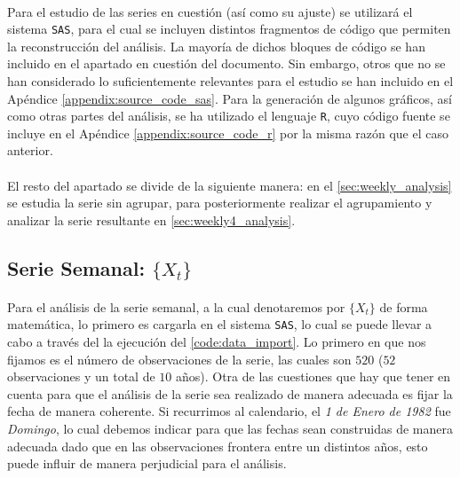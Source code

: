 \documentclass[a4paper, spanish]{article}
\begin{document}
    \paragraph{}
    Para el estudio de las series en cuestión (así como su ajuste) se utilizará el sistema \texttt{SAS}, para el cual se incluyen distintos fragmentos de código que permiten la reconstrucción del análisis. La mayoría de dichos bloques de código se han incluido en el apartado en cuestión del documento. Sin embargo, otros que no se han considerado lo suficientemente relevantes para el estudio se han incluido en el Apéndice \ref{appendix:source_code_sas}. Para la generación de algunos gráficos, así como otras partes del análisis, se ha utilizado el lenguaje \texttt{R}, cuyo código fuente se incluye en el Apéndice \ref{appendix:source_code_r} por la misma razón que el caso anterior.

    \paragraph{}
    El resto del apartado se divide de la siguiente manera: en el \autoref{sec:weekly_analysis} se estudia la serie sin agrupar, para posteriormente realizar el agrupamiento y analizar la serie resultante en \autoref{sec:weekly4_analysis}.

    \subsection{Serie Semanal: $\{X_t\}$}
    \label{sec:weekly_analysis}

      \paragraph{}
      Para el análisis de la serie semanal, a la cual denotaremos por $\{X_t\}$ de forma matemática, lo primero es cargarla en el sistema \texttt{SAS}, lo cual se puede llevar a cabo a través del la ejecución del \autoref{code:data_import}. Lo primero en que nos fijamos es el número de observaciones de la serie, las cuales son $520$ ($52$ observaciones y un total de $10$ años). Otra de las cuestiones que hay que tener en cuenta para que el análisis de la serie sea realizado de manera adecuada es fijar la fecha de manera coherente. Si recurrimos al calendario, el \emph{1 de Enero de 1982} fue \emph{Domingo}, lo cual debemos indicar para que las fechas sean construidas de manera adecuada dado que en las observaciones frontera entre un distintos años, esto puede influir de manera perjudicial para el análisis.
\end{document}
